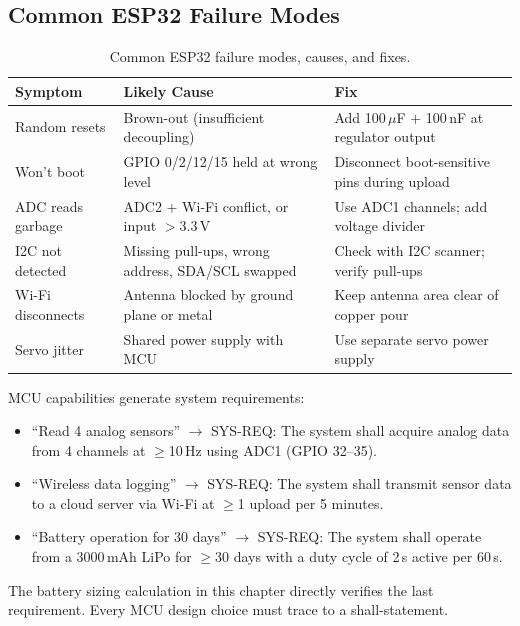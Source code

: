 \documentclass[11pt,letterpaper,twoside,openany]{book}
\begin{document}
\subsection{Common ESP32 Failure Modes}
\begin{table}[htbp]\centering\small
\begin{tabularx}{\textwidth}{l X X}
\toprule
\textbf{Symptom} & \textbf{Likely Cause} & \textbf{Fix} \\
\midrule
Random resets & Brown-out (insufficient decoupling) & Add 100\,$\mu$F + 100\,nF at regulator output \\
Won't boot & GPIO 0/2/12/15 held at wrong level & Disconnect boot-sensitive pins during upload \\
ADC reads garbage & ADC2 + Wi-Fi conflict, or input $>$3.3\,V & Use ADC1 channels; add voltage divider \\
I2C not detected & Missing pull-ups, wrong address, SDA/SCL swapped & Check with I2C scanner; verify pull-ups \\
Wi-Fi disconnects & Antenna blocked by ground plane or metal & Keep antenna area clear of copper pour \\
Servo jitter & Shared power supply with MCU & Use separate servo power supply \\
\bottomrule
\end{tabularx}
\caption{Common ESP32 failure modes, causes, and fixes.}
\end{table}

\begin{keyconceptbox}
MCU capabilities generate system requirements:
\begin{itemize}[nosep,leftmargin=1.5em]
\item ``Read 4 analog sensors'' $\to$ SYS-REQ: The system shall acquire analog data from 4 channels at $\geq$10\,Hz using ADC1 (GPIO 32--35).
\item ``Wireless data logging'' $\to$ SYS-REQ: The system shall transmit sensor data to a cloud server via Wi-Fi at $\geq$1 upload per 5 minutes.
\item ``Battery operation for 30 days'' $\to$ SYS-REQ: The system shall operate from a 3000\,mAh LiPo for $\geq$30 days with a duty cycle of 2\,s active per 60\,s.
\end{itemize}
The battery sizing calculation in this chapter directly verifies the last requirement. Every MCU design choice must trace to a shall-statement.
\end{keyconceptbox}
\end{document}
